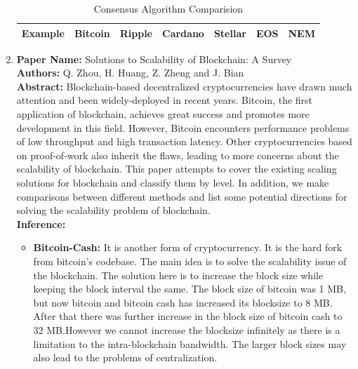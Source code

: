 \documentclass[oneside, 12pt]{book}
\begin{document}
\begin{enumerate}
\begin{table}[H]
{\begin{tabular}{|l|llllll|}
								Example                                                                & \multicolumn{1}{l|}{Bitcoin}                                                                     & \multicolumn{1}{l|}{Ripple}                                                                 & \multicolumn{1}{l|}{Cardano}               & \multicolumn{1}{l|}{Stellar}      & \multicolumn{1}{l|}{EOS}                                                                  & NEM                                                                  \\ \hline
							\end{tabular}%
						}
						\caption{Consensus Algorithm Comparision}
						\label{tab:consensus-algorithm-comparision}
					\end{table}
				\item
					\textbf{Paper Name:} Solutions to Scalability of Blockchain: A Survey \cite{zhou2020solutions}\\
					\textbf{Authors:} Q. Zhou, H. Huang, Z. Zheng and J. Bian\\
					\textbf{Abstract:} Blockchain-based decentralized cryptocurrencies have drawn much attention and been widely-deployed in recent years. Bitcoin, the first application of blockchain, achieves great success and promotes more development in this field. However, Bitcoin encounters performance problems of low throughput and high transaction latency. Other cryptocurrencies based on proof-of-work also inherit the flaws, leading to more concerns about the scalability of blockchain. This paper attempts to cover the existing scaling solutions for blockchain and classify them by level. In addition, we make comparisons between different methods and list some potential directions for solving the scalability problem of blockchain.\\
					\textbf{Inference:}
					\begin{itemize}
						\item\textbf{Bitcoin-Cash:} It is another form of cryptocurrency. It is the hard fork from bitcoin’s codebase. The main idea is to solve the scalability issue of the blockchain. The solution here is to increase the block size while keeping the block interval the same. The block size of bitcoin was 1 MB, but now bitcoin and bitcoin cash has increased its blocksize to 8 MB. After that there was further increase in the block size of bitcoin cash to 32 MB.However we cannot increase the blocksize infinitely as there is a limitation to the intra-blockchain bandwidth. The larger block sizes may also lead to the problems of centralization.

\end{itemize}
\end{enumerate}
\end{document}
